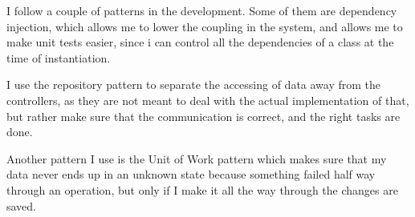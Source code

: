 I follow a couple of patterns in the development. Some of them are dependency
injection, which allows me to lower the coupling in the system, and allows me
to make unit tests easier, since i can control all the dependencies of a class
at the time of instantiation.

I use the repository pattern to separate the accessing of data away from the
controllers, as they are not meant to deal with the actual implementation of
that, but rather make sure that the communication is correct, and the right
tasks are done.

Another pattern I use is the Unit of Work pattern which makes sure that my data
never ends up in an unknown state because something failed half way through an
operation, but only if I make it all the way through the changes are saved.

